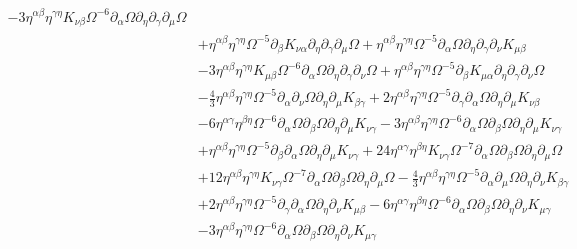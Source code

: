 \documentclass[10pt,letterpaper]{article}
\begin{document}
\begin{align}
 - 3 \eta^{\alpha \beta} \eta^{\gamma \eta} K_{\nu \beta} \Omega^{-6} \partial_{\alpha}\Omega \partial_{\eta}\partial_{\gamma}\partial_{\mu}\Omega\nonumber\\
& + \eta^{\alpha \beta} \eta^{\gamma \eta} \Omega^{-5} \partial_{\beta}K_{\nu \alpha} \partial_{\eta}\partial_{\gamma}\partial_{\mu}\Omega
 + \eta^{\alpha \beta} \eta^{\gamma \eta} \Omega^{-5} \partial_{\alpha}\Omega \partial_{\eta}\partial_{\gamma}\partial_{\nu}K_{\mu \beta}\nonumber\\
& - 3 \eta^{\alpha \beta} \eta^{\gamma \eta} K_{\mu \beta} \Omega^{-6} \partial_{\alpha}\Omega \partial_{\eta}\partial_{\gamma}\partial_{\nu}\Omega
 + \eta^{\alpha \beta} \eta^{\gamma \eta} \Omega^{-5} \partial_{\beta}K_{\mu \alpha} \partial_{\eta}\partial_{\gamma}\partial_{\nu}\Omega\nonumber\\
& -  \tfrac{4}{3} \eta^{\alpha \beta} \eta^{\gamma \eta} \Omega^{-5} \partial_{\alpha}\partial_{\nu}\Omega \partial_{\eta}\partial_{\mu}K_{\beta \gamma}
 + 2 \eta^{\alpha \beta} \eta^{\gamma \eta} \Omega^{-5} \partial_{\gamma}\partial_{\alpha}\Omega \partial_{\eta}\partial_{\mu}K_{\nu \beta}\nonumber\\
& - 6 \eta^{\alpha \gamma} \eta^{\beta \eta} \Omega^{-6} \partial_{\alpha}\Omega \partial_{\beta}\Omega \partial_{\eta}\partial_{\mu}K_{\nu \gamma}
 - 3 \eta^{\alpha \beta} \eta^{\gamma \eta} \Omega^{-6} \partial_{\alpha}\Omega \partial_{\beta}\Omega \partial_{\eta}\partial_{\mu}K_{\nu \gamma}\nonumber\\
& + \eta^{\alpha \beta} \eta^{\gamma \eta} \Omega^{-5} \partial_{\beta}\partial_{\alpha}\Omega \partial_{\eta}\partial_{\mu}K_{\nu \gamma}
 + 24 \eta^{\alpha \gamma} \eta^{\beta \eta} K_{\nu \gamma} \Omega^{-7} \partial_{\alpha}\Omega \partial_{\beta}\Omega \partial_{\eta}\partial_{\mu}\Omega\nonumber\\
& + 12 \eta^{\alpha \beta} \eta^{\gamma \eta} K_{\nu \gamma} \Omega^{-7} \partial_{\alpha}\Omega \partial_{\beta}\Omega \partial_{\eta}\partial_{\mu}\Omega
 -  \tfrac{4}{3} \eta^{\alpha \beta} \eta^{\gamma \eta} \Omega^{-5} \partial_{\alpha}\partial_{\mu}\Omega \partial_{\eta}\partial_{\nu}K_{\beta \gamma}\nonumber\\
& + 2 \eta^{\alpha \beta} \eta^{\gamma \eta} \Omega^{-5} \partial_{\gamma}\partial_{\alpha}\Omega \partial_{\eta}\partial_{\nu}K_{\mu \beta}
 - 6 \eta^{\alpha \gamma} \eta^{\beta \eta} \Omega^{-6} \partial_{\alpha}\Omega \partial_{\beta}\Omega \partial_{\eta}\partial_{\nu}K_{\mu \gamma}\nonumber\\
& - 3 \eta^{\alpha \beta} \eta^{\gamma \eta} \Omega^{-6} \partial_{\alpha}\Omega \partial_{\beta}\Omega \partial_{\eta}\partial_{\nu}K_{\mu \gamma}

\end{align}
\end{document}
